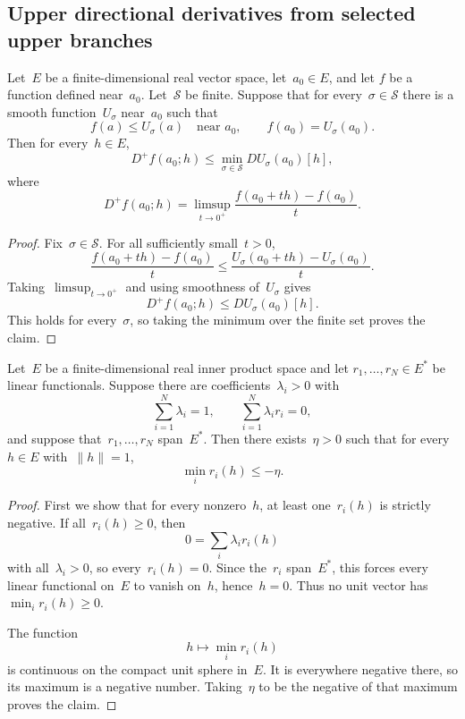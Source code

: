 \subsection{Upper directional derivatives from selected upper branches}
\label{sec:hko-upper-directional-derivatives}

\begin{lemma}
\label{lem:hko-upper-branch-directional-inequality}
Let~$E$ be a finite-dimensional real vector space, let~$a_0\in E$, and let
$f$ be a function defined near~$a_0$.  Let~$\mathcal S$ be finite.  Suppose
that for every~$\sigma\in\mathcal S$ there is a smooth function~$U_\sigma$
near~$a_0$ such that
\[
  f(a)\leq U_\sigma(a)
  \quad\text{near }a_0,
  \qquad
  f(a_0)=U_\sigma(a_0).
\]
Then for every~$h\in E$,
\[
  D^+f(a_0;h)
  \leq
  \min_{\sigma\in\mathcal S}DU_\sigma(a_0)[h],
\]
where
\[
  D^+f(a_0;h)
  =
  \limsup_{t\to0^+}\frac{f(a_0+th)-f(a_0)}{t}.
\]
\end{lemma}

\begin{proof}
Fix~$\sigma\in\mathcal S$.  For all sufficiently small~$t>0$,
\[
  \frac{f(a_0+th)-f(a_0)}{t}
  \leq
  \frac{U_\sigma(a_0+th)-U_\sigma(a_0)}{t}.
\]
Taking~$\limsup_{t\to0^+}$ and using smoothness of~$U_\sigma$ gives
\[
  D^+f(a_0;h)\leq DU_\sigma(a_0)[h].
\]
This holds for every~$\sigma$, so taking the minimum over the finite set
proves the claim.
\end{proof}

\begin{lemma}
\label{lem:hko-positive-convex-certificate-margin}
Let~$E$ be a finite-dimensional real inner product space and let
$r_1,\ldots,r_N\in E^*$ be linear functionals.  Suppose there are
coefficients~$\lambda_i>0$ with
\[
  \sum_{i=1}^N\lambda_i=1,\qquad
  \sum_{i=1}^N\lambda_i r_i=0,
\]
and suppose that~$r_1,\ldots,r_N$ span~$E^*$.  Then there exists~$\eta>0$
such that for every~$h\in E$ with~$\|h\|=1$,
\[
  \min_i r_i(h)\leq -\eta.
\]
\end{lemma}

\begin{proof}
First we show that for every nonzero~$h$, at least one~$r_i(h)$ is strictly
negative.  If all~$r_i(h)\geq0$, then
\[
  0=\sum_i\lambda_i r_i(h)
\]
with all~$\lambda_i>0$, so every~$r_i(h)=0$.  Since the~$r_i$ span~$E^*$,
this forces every linear functional on~$E$ to vanish on~$h$, hence~$h=0$.
Thus no unit vector has~$\min_i r_i(h)\geq0$.

The function
\[
  h\mapsto \min_i r_i(h)
\]
is continuous on the compact unit sphere in~$E$.  It is everywhere negative
there, so its maximum is a negative number.  Taking~$\eta$ to be the negative
of that maximum proves the claim.
\end{proof}

